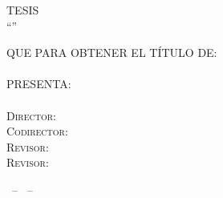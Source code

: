 \begin{titlepage}
\begin{addmargin}[-1cm]{-3cm}
{{\begin{center}
	\textsc{TESIS}\\\bigskip
	\begingroup
		{\Large
		\textsc{\color{Maroon}\textsc{``\myTitle''}}\\  
		\bigskip
		\bigskip
		{\color{Maroon}\texttt{\mySubtitle}}}
	\endgroup
	
	\bigskip 
	\bigskip 
	\bigskip
	
	\textsc{QUE PARA OBTENER EL TÍTULO DE:}\\
	\bigskip
	{\large\textsc{\myDegree}\\\bigskip}
	\textsc{PRESENTA:}\\
	{\large\textsc{\myName}}\\ %
	\bigskip
	\bigskip
	{\large
	\textsc{Director: \myProf}\\
	\textsc{Codirector: \myOtherProf}\\
	\textsc{Revisor: \mySupervisor}\\
	\textsc{Revisor: \myOtherSupervisor}\\}
\end{center}}}
\endgroup
\bigskip
\bigskip
\bigskip
\begin{center}
\textsc{\myLocation \, -- \myTime \, -- \myThesisVersion}
\end{center}
\end{addmargin}
\end{titlepage}